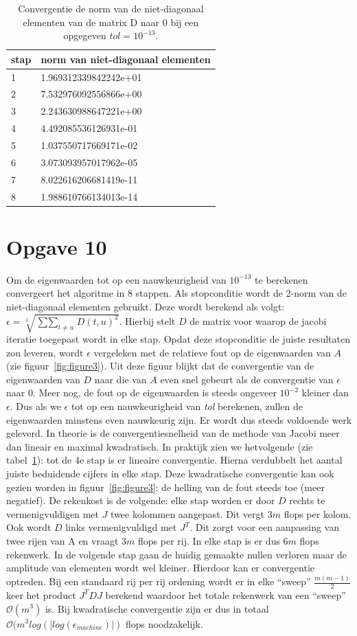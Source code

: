 \documentclass[a4paper]{article}
\newcommand{\opgave}[1]{\section*{Opgave #1}}
\begin{document}
\begin{table}[h]
\begin{tabular}{|l|l|}
\hline
stap & norm van niet-diagonaal elementen\\
\hline
1 & 1.969312339842242e+01\\
2 & 7.532976092556866e+00\\
3 & 2.243630988647221e+00\\
4 & 4.492085536126931e-01\\
5 & 1.037550717669171e-02\\
6 & 3.073093957017962e-05\\
7 & 8.022616206681419e-11\\
8 & 1.988610766134013e-14\\
\hline
\end{tabular}
\caption{Convergentie de norm van de niet-diagonaal elementen van de matrix D naar 0 bij een opgegeven $tol =10^{-13}$.}
\label{table:tab2}
\end{table}
\opgave{10}
Om de eigenwaarden tot op een nauwkeurigheid van $10^{-13}$ te berekenen convergeert het algoritme in 8 stappen. Als stopconditie wordt de 2-norm van de niet-diagonaal elementen gebruikt. Deze wordt berekend als volgt: $\epsilon = \sqrt[2]{\mathop{\sum\sum}_{t\neq u} D(t,u)^2}$. Hierbij stelt $D$ de matrix voor waarop de jacobi iteratie toegepast wordt in elke stap. Opdat deze stopconditie de juiste resultaten zou leveren, wordt $\epsilon$ vergeleken met de relatieve fout op de eigenwaarden van $A$ (zie figuur~\ref{fig:figure3}). Uit deze figuur blijkt dat de convergentie van de eigenwaarden van $D$ naar die van $A$ even snel gebeurt als de convergentie van $\epsilon$ naar 0. Meer nog, de fout op de eigenwaarden is steeds ongeveer $10^{-2}$ kleiner dan $\epsilon$. Dus als we $\epsilon$ tot op een nauwkeurigheid van \textit{tol} berekenen, zullen de eigenwaarden minstens even nauwkeurig zijn. Er wordt dus steeds voldoende werk geleverd. 
In theorie is de convergentiesnelheid van de methode van Jacobi meer dan lineair en maximal kwadratisch. In praktijk zien we hetvolgende (zie tabel~\ref{table:tab2}): tot de 4e stap is er lineaire convergentie. Hierna verdubbelt het aantal juiste beduidende cijfers in elke stap. Deze kwadratische convergentie kan ook gezien worden in figuur~\ref{fig:figure3}: de helling van de fout steeds toe (meer negatief).
De rekenkost is de volgende: elke stap worden er door $D$ rechts te vermenigvuldigen met $J$ twee kolommen aangepast. Dit vergt $3m$   flops per kolom. Ook wordt $D$ links vermenigvuldigd met $J^{T}$.  Dit zorgt voor een aanpassing van twee rijen van A en vraagt $3m$ flops per rij. In elke stap is er dus $6m$ flops rekenwerk. In de volgende stap gaan de huidig gemaakte nullen verloren maar de amplitude van elementen wordt wel kleiner. Hierdoor kan er convergentie optreden. Bij een standaard rij per rij ordening wordt er in elke “sweep” $\frac{m(m-1)}{2}$ keer het product $J^{T}D J$ berekend waardoor het totale rekenwerk van een “sweep” $\mathcal{O}(m^{3})$ is. Bij kwadratische convergentie zijn er dus in totaal $\mathcal{O}(m^{3}log(|log(\epsilon_{machine})|)$ flops noodzakelijk.
\end{document}

